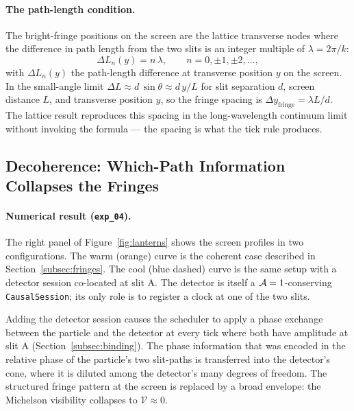 \paragraph{The path-length condition.}
The bright-fringe positions on the screen are the lattice transverse
nodes where the difference in path length from the two slits is an
integer multiple of $\lambda = 2\pi/k$:
\begin{equation}
    \Delta L_n(y) = n\,\lambda, \qquad n = 0, \pm 1, \pm 2, \ldots,
    \label{eq:fringe_condition}
\end{equation}
with $\Delta L_n(y)$ the path-length difference at transverse position
$y$ on the screen. In the small-angle limit
$\Delta L \approx d\,\sin\theta \approx d\,y/L$ for slit separation
$d$, screen distance $L$, and transverse position $y$, so the fringe
spacing is $\Delta y_\text{fringe} = \lambda L / d$. The lattice
result reproduces this spacing in the long-wavelength continuum limit
without invoking the formula --- the spacing is what the tick rule
produces.

\subsection{Decoherence: Which-Path Information Collapses the Fringes}
\label{subsec:decoherence}

\paragraph{Numerical result (\texttt{exp\_04}).}
The right panel of Figure~\ref{fig:lanterns} shows the screen
profiles in two configurations. The warm (orange) curve is the
coherent case described in Section~\ref{subsec:fringes}. The cool
(blue dashed) curve is the same setup with a detector session
co-located at slit A. The detector is itself a $\mathcal{A}=1$-conserving
\texttt{CausalSession}; its only role is to register a clock at one
of the two slits.

Adding the detector session causes the scheduler to apply a phase
exchange between the particle and the detector at every tick where
both have amplitude at slit A
(Section~\ref{subsec:binding}). The phase information that was
encoded in the relative phase of the particle's two slit-paths is
transferred into the detector's cone, where it is diluted among the
detector's many degrees of freedom. The structured fringe pattern at
the screen is replaced by a broad envelope: the Michelson visibility
collapses to $\mathcal{V} \approx 0$.


